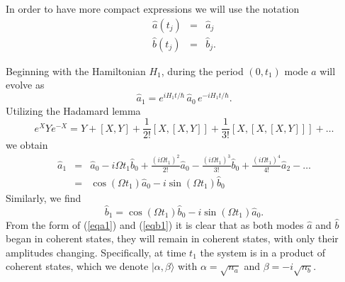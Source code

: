 \documentclass[12pt]{iopart}
\begin{document}
In order to have more compact expressions we will use the notation
\begin{eqnarray}
\hat{a}(t_j) &=& \hat{a}_j \\
\hat{b}(t_j) &=& \hat{b}_j.
\end{eqnarray}

Beginning with the Hamiltonian $H_1$, during the period $(0, t_1)$ mode $\hat{a}$ will evolve as
\begin{equation}
\hat{a}_1 = e^{ i H_1 t/ \hbar} \, \hat{a}_0 \, e^{-i H_1 t/ \hbar}.
\end{equation}
Utilizing the Hadamard lemma
\begin{equation}
e^X Y e^{-X} = Y + [X,Y] + \frac{1}{2!}[X,[X,Y]] + \frac{1}{3!}[X,[X,[X,Y]]] + \ldots
\label{eqHadamard}
\end{equation}
we obtain 
\begin{eqnarray}
\hat{a}_1 &=& \hat{a}_0 - i \Omega t_1 \hat{b}_0 + \frac{(i \Omega t_1)^2}{2!} \hat{a}_0 - \frac{(i \Omega t_1)^3}{3!} \hat{b}_0 + \frac{(i \Omega t_1)^4}{4!} \hat{a}_2 - \ldots \nonumber \\
          &=& \cos (\Omega t_1) \hat{a}_0 -i \sin (\Omega t_1) \hat{b}_0
\label{eqa1}
\end{eqnarray}
Similarly, we find
\begin{equation}
\hat{b}_1 = \cos (\Omega t_1) \hat{b}_0 - i \sin (\Omega t_1) \hat{a}_0.
\label{eqb1}
\end{equation}
From the form of (\ref{eqa1}) and (\ref{eqb1}) it is clear that as both modes $\hat{a}$ and $\hat{b}$ began in coherent states, they will remain in coherent states, with only their amplitudes changing. Specifically, at time $t_1$ the system is in a product of coherent states, which we denote $|\alpha, \beta\rangle$ with $\alpha=\sqrt{n_a}$ and $\beta=-i\sqrt{n_b}$.
\end{document}
